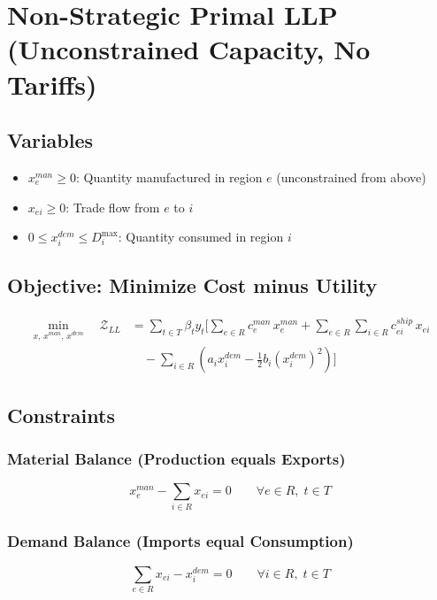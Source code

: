 \documentclass{article}
\begin{document}
\section*{Non-Strategic Primal LLP (Unconstrained Capacity, No Tariffs)}

\subsection*{Variables}
\begin{itemize}
    \item $x_e^{man} \ge 0$: Quantity manufactured in region $e$ (unconstrained from above)
    \item $x_{ei} \ge 0$: Trade flow from $e$ to $i$
    \item $0 \le x_i^{dem} \le D_i^{\max}$: Quantity consumed in region $i$
\end{itemize}

\subsection*{Objective: Minimize Cost minus Utility}
\begin{align}
\min_{x,\,x^{man},\,x^{dem}} \quad
\mathcal{Z}_{LL}
&=
\sum_{t \in T} \beta_t y_t \Bigg[
\sum_{e \in R} c_e^{man}\,x_e^{man}
+
\sum_{e \in R}\sum_{i \in R}
c_{ei}^{ship}\,x_{ei}
\nonumber\\
&\quad
-
\sum_{i \in R}
\left(
a_i x_i^{dem} - \frac{1}{2} b_i (x_i^{dem})^2
\right)
\Bigg]
\end{align}

\subsection*{Constraints}

\subsubsection*{Material Balance (Production equals Exports)}
\begin{equation}
x_e^{man} - \sum_{i \in R} x_{ei} = 0 \qquad \forall e \in R,\; t \in T
\end{equation}

\subsubsection*{Demand Balance (Imports equal Consumption)}
\begin{equation}
\sum_{e \in R} x_{ei} - x_i^{dem} = 0 \qquad \forall i \in R,\; t \in T
\end{equation}
\end{document}
